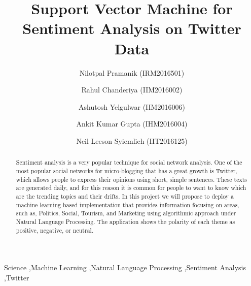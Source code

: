 \documentclass[preprint,12pt]{elsarticle}
\begin{document}
\begin{frontmatter}


\title{Support Vector Machine for Sentiment Analysis on Twitter Data}




\author{Nilotpal Pramanik (IRM2016501)}

\author{Rahul Chanderiya (IIM2016002)}

\author{Ashutosh Yelgulwar (IIM2016006)}

\author{Ankit Kumar Gupta (IHM2016004)}

\author{Neil Leeson Syiemlieh (IIT2016125)}

\address{IIIT, Allahabad}

\begin{abstract}
Sentiment analysis is a very popular technique for social network analysis. One of the most popular social networks for micro-blogging that has a great growth is Twitter, which allows people to express their opinions using short, simple sentences. These texts are generated daily, and for this reason it is common for people to want to know which are the trending topics and their drifts. In this project we will propose to deploy a machine learning based implementation that provides information focusing on areas, such as, Politics, Social, Tourism, and Marketing using algorithmic approach under Natural Language Processing. The application shows the polarity of each theme as positive, negative, or neutral. \\
\end{abstract}

\begin{keyword}
Science \sep Machine Learning \sep Natural Language Processing \sep Sentiment Analysis \sep Twitter\\  


\end{keyword}

\end{frontmatter}
\end{document}
